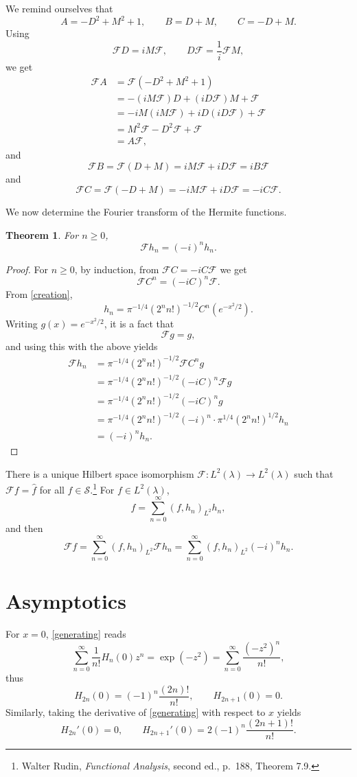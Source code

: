 \documentclass{article}
\newtheorem{theorem}{Theorem}
\theoremstyle{definition}
\begin{document}
We remind ourselves that 
\[
A=-D^2+M^2+1, \qquad B=D+M,\qquad C=-D+M.
\]
Using 
\[
\mathscr{F}D = iM\mathscr{F},\qquad D\mathscr{F}=\frac{1}{i}\mathscr{F}M,
\]
we get
\begin{align*}
\mathscr{F}A&=\mathscr{F}(-D^2+M^2+1)\\
&=-(iM\mathscr{F})D+(iD\mathscr{F})M+\mathscr{F}\\
&=-iM(iM\mathscr{F})+iD(iD\mathscr{F})+\mathscr{F}\\
&=M^2\mathscr{F}-D^2\mathscr{F}+\mathscr{F}\\
&=A\mathscr{F},
\end{align*}
and
\[
\mathscr{F}B=\mathscr{F}(D+M)=iM\mathscr{F}+iD\mathscr{F}=iB\mathscr{F}
\]
and
\[
\mathscr{F}C=\mathscr{F}(-D+M)=-iM\mathscr{F}+iD\mathscr{F}=
-iC\mathscr{F}.
\]

We now determine the Fourier transform of the Hermite functions.

\begin{theorem}
For $n \geq 0$,
\[
\mathscr{F}h_n= (-i)^n h_n.
\]
\end{theorem}
\begin{proof}
For $n \geq 0$, by induction,  from $\mathscr{F}C = -iC\mathscr{F}$ we get
\[
\mathscr{F}C^n = (-iC)^n \mathscr{F}.
\]
From \eqref{creation},
\[
h_n=\pi^{-1/4}(2^n n!)^{-1/2} C^n(e^{-x^2/2}).
\]
Writing $g(x)=e^{-x^2/2}$, it is a fact that
\[
\mathscr{F}g = g,
\]
and using this with the above yields
\begin{align*}
\mathscr{F}h_n&=\pi^{-1/4}(2^n n!)^{-1/2} \mathscr{F} C^n g\\
&=\pi^{-1/4}(2^n n!)^{-1/2} (-iC)^n  \mathscr{F}g\\
&=\pi^{-1/4}(2^n n!)^{-1/2} (-iC)^ng\\
&=\pi^{-1/4}(2^n n!)^{-1/2} (-i)^n \cdot \pi^{1/4} (2^n n!)^{1/2} h_n\\
&=(-i)^n h_n.
\end{align*}
\end{proof}



There is a unique Hilbert space isomorphism $\mathscr{F}:L^2(\lambda) \to L^2(\lambda)$
such that $\mathscr{F}f=\hat{f}$ for all $f \in \mathscr{S}$.\footnote{Walter Rudin, {\em Functional Analysis}, second ed.,
p.~188, Theorem 7.9.}
For $f \in L^2(\lambda)$, 
\[
f = \sum_{n=0}^\infty (f,h_n)_{L^2} h_n,
\]
and then
\[
\mathscr{F} f = \sum_{n=0}^\infty (f,h_n)_{L^2} \mathscr{F}h_n
= \sum_{n=0}^\infty (f,h_n)_{L^2} (-i)^n h_n.
\]


\section{Asymptotics}
For $x=0$, \eqref{generating} reads
\[
\sum_{n=0}^\infty \frac{1}{n!} H_n(0)z^n = \exp(-z^2) = \sum_{n=0}^\infty \frac{(-z^2)^n}{n!},
\]
thus
\[
H_{2n}(0) = (-1)^n \frac{(2n)!}{n!},\qquad H_{2n+1}(0)=0.
\]
Similarly, taking the derivative of \eqref{generating} with respect to $x$ yields
\[
H_{2n}'(0)=0,\qquad H_{2n+1}'(0) = 2(-1)^n \frac{(2n+1)!}{n!}.
\]
\end{document}
